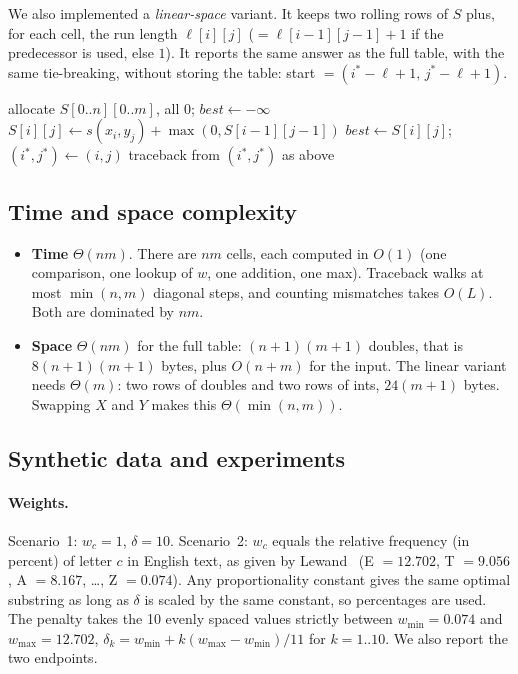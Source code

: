 \documentclass[11pt]{article}
\begin{document}
We also implemented a \emph{linear-space} variant. It keeps two rolling rows of
$S$ plus, for each cell, the run length $\ell[i][j]$ ($=\ell[i-1][j-1]+1$ if the
predecessor is used, else $1$). It reports the same answer as the full table,
with the same tie-breaking, without storing the table: start $=(i^\ast-\ell+1,\,j^\ast-\ell+1)$.

\begin{algorithm}[h]
\caption{Weighted approximate common substring (full table)}
\begin{algorithmic}[1]
\State allocate $S[0..n][0..m]$, all $0$; $\mathit{best}\gets-\infty$
    \State $S[i][j] \gets s(x_i,y_j) + \max(0, S[i-1][j-1])$
     $\mathit{best}\gets S[i][j]$; $(i^\ast,j^\ast)\gets(i,j)$ \EndIf
  \EndFor
\EndFor
\State traceback from $(i^\ast,j^\ast)$ as above
\end{algorithmic}
\end{algorithm}

\subsection{Time and space complexity}
\begin{itemize}
\item \textbf{Time} $\Theta(nm)$. There are $nm$ cells, each computed in $O(1)$
  (one comparison, one lookup of $w$, one addition, one max). Traceback walks
  at most $\min(n,m)$ diagonal steps, and counting mismatches takes $O(L)$. Both
  are dominated by $nm$.
\item \textbf{Space} $\Theta(nm)$ for the full table: $(n+1)(m+1)$ doubles,
  that is $8(n+1)(m+1)$ bytes, plus $O(n+m)$ for the input. The linear variant needs
  $\Theta(m)$: two rows of doubles and two rows of ints, $24(m+1)$ bytes.
  Swapping $X$ and $Y$ makes this $\Theta(\min(n,m))$.
\end{itemize}

\subsection{Synthetic data and experiments}
\paragraph{Weights.} Scenario~1: $w_c=1$, $\delta=10$. Scenario~2:
$w_c$ equals the relative frequency (in percent) of letter $c$ in English text,
as given by Lewand~\cite{lewand} (E $=12.702$, T $=9.056$, A $=8.167$, \dots,
Z $=0.074$). Any proportionality constant gives the same optimal substring as
long as $\delta$ is scaled by the same constant, so percentages are used. The
penalty takes the 10 evenly spaced values strictly between
$w_{\min}=0.074$ and $w_{\max}=12.702$,
$\delta_k=w_{\min}+k(w_{\max}-w_{\min})/11$ for $k=1..10$. We also report the
two endpoints.
\end{document}
